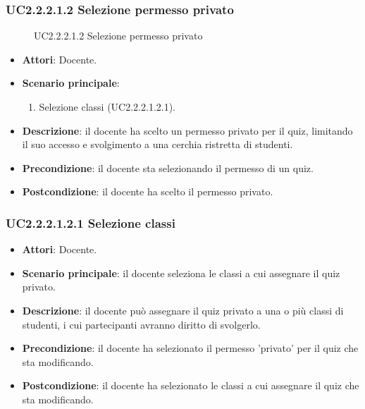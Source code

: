 \subsubsection{UC2.2.2.1.2 Selezione permesso privato}
\begin{figure}[H]
\centering
\noindent{}
\caption{UC2.2.2.1.2 Selezione permesso privato}
\end{figure}
\begin{itemize}
\item \textbf{Attori}: Docente.
\item \textbf{Scenario principale}:
\begin{enumerate}
\item Selezione classi (UC2.2.2.1.2.1).
\end{enumerate}
\item \textbf{Descrizione}: il docente ha scelto un permesso privato per il quiz, limitando il suo accesso e svolgimento a una cerchia ristretta di studenti.
\item \textbf{Precondizione}: il docente sta selezionando il permesso di un quiz.
\item \textbf{Postcondizione}: il docente ha scelto il permesso privato.
\end{itemize}
\subsubsection{UC2.2.2.1.2.1 Selezione classi}
\begin{itemize}
\item \textbf{Attori}: Docente.
\item \textbf{Scenario principale}: il docente seleziona le classi a cui assegnare il quiz privato.
\item \textbf{Descrizione}: il docente può assegnare il quiz privato a una o più classi di studenti, i cui partecipanti avranno diritto di svolgerlo.
\item \textbf{Precondizione}: il docente ha selezionato il permesso 'privato' per il quiz che sta modificando.
\item \textbf{Postcondizione}: il docente ha selezionato le classi a cui assegnare il quiz che sta modificando.
\end{itemize}
